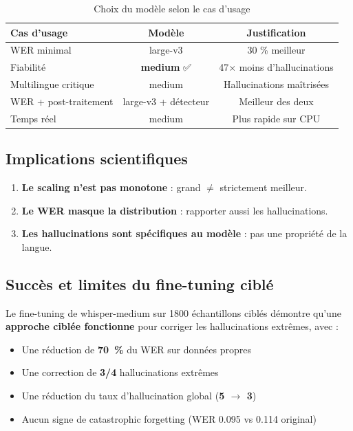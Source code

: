 \documentclass[11pt,a4paper]{article}
\begin{document}
\begin{table}[h]
\centering
\caption{Choix du modèle selon le cas d'usage}
\label{tab:recommendations}
\begin{tabular}{lcc}
\toprule
\textbf{Cas d'usage} & \textbf{Modèle} & \textbf{Justification} \\
\midrule
WER minimal           & large-v3 & 30 \% meilleur \\
Fiabilité             & \textbf{medium} ✅ & 47$\times$ moins d'hallucinations \\
Multilingue critique  & medium   & Hallucinations maîtrisées \\
WER + post-traitement & large-v3 + détecteur & Meilleur des deux \\
Temps réel            & medium   & Plus rapide sur CPU \\
\bottomrule
\end{tabular}
\end{table}

\subsection{Implications scientifiques}

\begin{enumerate}
    \item \textbf{Le scaling n'est pas monotone} : grand $\neq$ strictement
    meilleur.
    \item \textbf{Le WER masque la distribution} : rapporter aussi les
    hallucinations.
    \item \textbf{Les hallucinations sont spécifiques au modèle} : pas une
    propriété de la langue.
\end{enumerate}


\subsection{Succès et limites du fine-tuning ciblé}

Le fine-tuning de whisper-medium sur 1800 échantillons ciblés démontre
qu'une \textbf{approche ciblée fonctionne} pour corriger les hallucinations
extrêmes, avec :

\begin{itemize}
	\item Une réduction de \textbf{70~\%} du WER sur données propres
	\item Une correction de \textbf{3/4} hallucinations extrêmes
	\item Une réduction du taux d'hallucination global (\textbf{5 $\to$ 3})
	\item Aucun signe de catastrophic forgetting (WER 0.095 vs 0.114 original)
\end{itemize}
\end{document}
